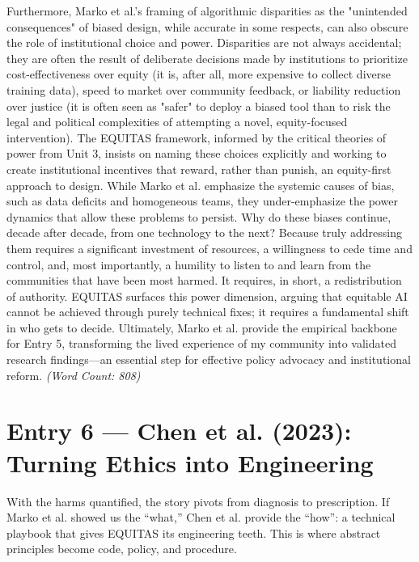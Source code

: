 \documentclass[11pt,twoside]{article}
\begin{document}
Furthermore, Marko et al.'s framing of algorithmic disparities as the "unintended consequences" of biased design, while accurate in some respects, can also obscure the role of institutional choice and power. Disparities are not always accidental; they are often the result of deliberate decisions made by institutions to prioritize cost-effectiveness over equity (it is, after all, more expensive to collect diverse training data), speed to market over community feedback, or liability reduction over justice (it is often seen as "safer" to deploy a biased tool than to risk the legal and political complexities of attempting a novel, equity-focused intervention). The EQUITAS framework, informed by the critical theories of power from Unit 3, insists on naming these choices explicitly and working to create institutional incentives that reward, rather than punish, an equity-first approach to design. While Marko et al. emphasize the systemic causes of bias, such as data deficits and homogeneous teams, they under-emphasize the power dynamics that allow these problems to persist. Why do these biases continue, decade after decade, from one technology to the next? Because truly addressing them requires a significant investment of resources, a willingness to cede time and control, and, most importantly, a humility to listen to and learn from the communities that have been most harmed. It requires, in short, a redistribution of authority. EQUITAS surfaces this power dimension, arguing that equitable AI cannot be achieved through purely technical fixes; it requires a fundamental shift in who gets to decide. Ultimately, Marko et al. provide the empirical backbone for Entry 5, transforming the lived experience of my community into validated research findings—an essential step for effective policy advocacy and institutional reform. \textit{(Word Count: 808)}

\newpage
\section*{Entry 6 --- Chen et al. (2023): Turning Ethics into Engineering}

{
\vspace{-0.3cm}
With the harms quantified, the story pivots from diagnosis to prescription. If Marko et al. showed us the ``what,'' Chen et al. provide the ``how'': a technical playbook that gives \textsc{EQUITAS} its engineering teeth. This is where abstract principles become code, policy, and procedure.
}
\end{document}
